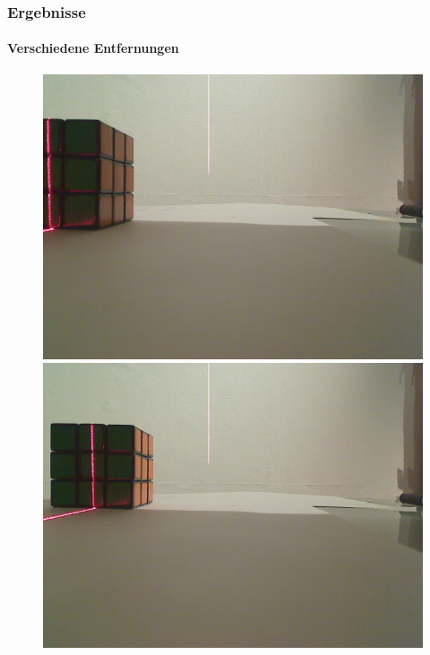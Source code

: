 \documentclass[xcolor=dvipsnames]{beamer}
\begin{document}
\begin{frame}
	\frametitle{Ergebnisse}
	\framesubtitle{Verschiedene Entfernungen}

	\begin{figure}
		\begin{minipage}{0.32\linewidth}
			\includegraphics[width=\linewidth]{includes/test_dist_1}
		\end{minipage}
		\hfill
		\begin{minipage}{0.32\linewidth}
			\includegraphics[width=\linewidth]{includes/test_dist_2}

\end{minipage}
\end{figure}
\end{frame}
\end{document}
